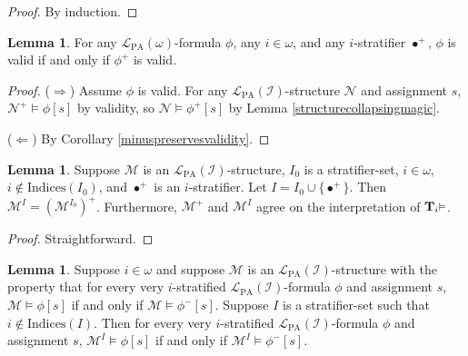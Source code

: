 \documentclass[reqno]{article}
\theoremstyle{definition}
\newtheorem{lemma}[theorem]{Lemma}
\def\L{\mathscr{L}}
\def\M{\mathscr{M}}
\def\T{\mathbf{T}}
\def\indices{\mathrm{Indices}}
\def\LPA{\L_{\mathrm{PA}}}
\def\indset{\mathcal I}
\renewcommand{\Pr}[1]{\T_{#1}\mbox{\small${\vDash}$}}
\begin{document}

\begin{proof}
By induction.
\end{proof}


\begin{lemma}
\label{stratifiersrespectvalidity}
For any $\LPA(\omega)$-formula $\phi$,
any $i\in\omega$, and any $i$-stratifier $\bullet^+$,
$\phi$ is valid if and only if $\phi^+$ is valid.
\end{lemma}

\begin{proof}
\item
($\Rightarrow$)
Assume $\phi$ is valid.
For any $\LPA(\indset)$-structure $\mathscr N$ and assignment $s$,
$\mathscr N^+\models\phi[s]$ by validity, so $\mathscr N\models\phi^+[s]$ by
Lemma \ref{structurecollapsingmagic}.

\item
($\Leftarrow$)
By Corollary \ref{minuspreservesvalidity}.
\end{proof}

\begin{lemma}
\label{decomposingMtotheI}
Suppose $\M$ is an $\LPA(\indset)$-structure,
$I_0$ is a stratifier-set, $i\in\omega$, $i\not\in\indices(I_0)$,
and $\bullet^+$ is an $i$-stratifier.
Let $I=I_0\cup\{\bullet^+\}$.
Then $\M^I=(\M^{I_0})^+$.
Furthermore, $\M^+$ and $\M^I$ agree on the interpretation of $\Pr i$.
\end{lemma}

\begin{proof}
Straightforward.
\end{proof}

\begin{lemma}
\label{technicalLemmaToShortenMainProof}
    Suppose $i\in\omega$ and suppose $\M$ is an $\LPA(\indset)$-structure
    with the property that for every very $i$-stratified $\LPA(\indset)$-formula
    $\phi$ and assignment $s$, $\M\models\phi[s]$ if and only if $\M\models\phi^-[s]$.
    Suppose $I$ is a stratifier-set such that $i\not\in\indices(I)$.
    Then for every very $i$-stratified $\LPA(\indset)$-formula $\phi$ and assignment
    $s$, $\M^I\models\phi[s]$ if and only if $\M^I\models\phi^-[s]$.
\end{lemma}
\end{document}
